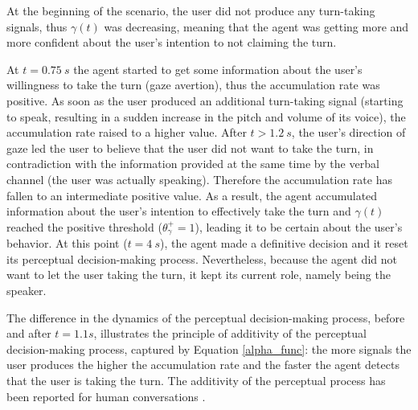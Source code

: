 At the beginning of the scenario, the user did not produce any turn-taking signals, thus $\gamma(t)$ was decreasing, meaning that the agent was getting more and more confident about the user's intention to not claiming the turn. 

At $t=0.75~s$ the agent started to get some information about the user's willingness to take the turn (gaze avertion), thus the accumulation rate was positive. 
As soon as the user produced an additional turn-taking signal (starting to speak, resulting in a sudden increase in the pitch and volume of its voice), the accumulation rate raised to a higher value. 
After $t>1.2~s$, the user's direction of gaze led the user to believe that the user did not want to take the turn, in contradiction with the information provided at the same time by the verbal channel (the user was actually speaking). Therefore the accumulation rate has fallen to an intermediate positive value. 
As a result, the agent accumulated information about the user's intention to effectively take the turn and $\gamma(t)$ reached the positive threshold ($\theta_{\gamma}^{+}=1$), leading it to be certain about the user's behavior. At this point ($t=4~s$), the agent made a definitive decision and it reset its perceptual decision-making process. 
Nevertheless, because the agent did not want to let the user taking the turn, it kept its current role, namely being the speaker. 


The  difference in the dynamics of the perceptual decision-making process, before and after $t=1.1s$, illustrates the principle of additivity of the perceptual decision-making process, captured by Equation \ref{alpha_func}: the more signals the user produces
 the higher the accumulation rate and the faster the agent detects that the user is taking the turn. The additivity of the perceptual process has been reported for human conversations \citep{gravano_turn-taking_2011,hjalmarsson_additive_2011}. 

